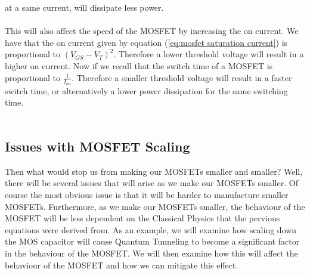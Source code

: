 \documentclass[
  reprint,
  amsmath,amssymb,
  aps
]{revtex4-1}
\begin{document}
at a same current, will dissipate less power.\\\\
This will also affect the speed of the MOSFET by increasing the on current. We have that the on current given by 
equation (\ref{eq:mosfet saturation current}) is proportional to $(V_{GS}-V_{T})^{2}$. Therefore a lower threshold voltage will result in 
a higher on current. Now if we recall that the switch time of a MOSFET is proportional to $\frac{1}{I_{on}}$. Therefore 
a smaller threshold voltage will result in a faster switch time, or alternatively a lower power dissipation for the 
same switching time.\\\\
\subsection*{Issues with MOSFET Scaling}
Then what would stop us from making our MOSFETs smaller and smaller? Well, there will be several issues that will 
arise as we make our MOSFETs smaller. Of course the most obvious issue is that it will be harder to manufacture smaller MOSFETs. Furthermore, 
as we make our MOSFETs smaller, the behaviour of the MOSFET will be less dependent on the Classical Physics that the pervious 
equations were derived from. As an example, we will examine how scaling down the 
MOS capacitor will cause Quantum Tunneling to become a significant factor in the behaviour of the MOSFET. We will 
then examine how this will affect the behaviour of the MOSFET and how we can mitigate this effect.\\\\
\end{document}
